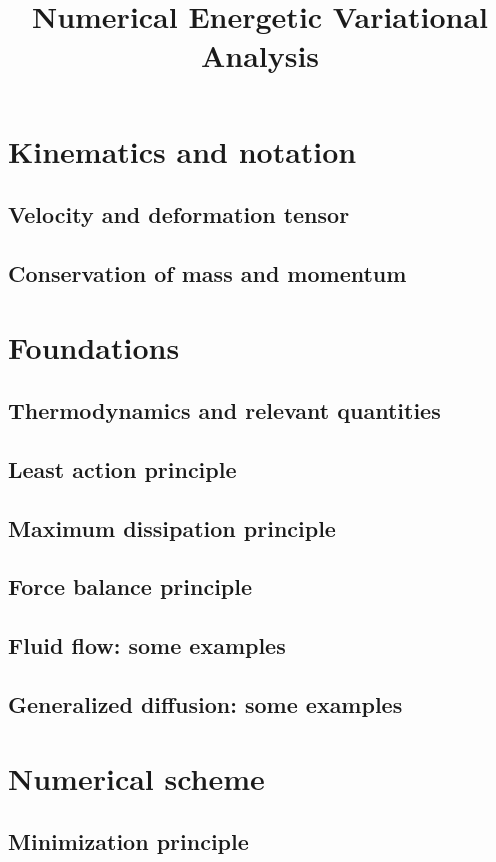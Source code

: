 \documentclass[final,10pt]{article}
\begin{document}
\title{Numerical Energetic Variational Analysis}
\maketitle


\section{Kinematics and notation}
\subsection{Velocity and deformation tensor}
\subsection{Conservation of mass and momentum}


\section{Foundations}
\subsection{Thermodynamics and relevant quantities}
\subsection{Least action principle}
\subsection{Maximum dissipation principle}
\subsection{Force balance principle}
\subsection{Fluid flow: some examples}
\subsection{Generalized diffusion: some examples}



\section{Numerical scheme}
\subsection{Minimization principle}
\end{document}
